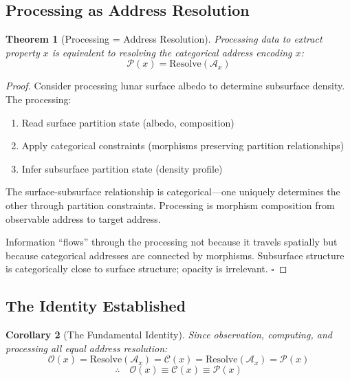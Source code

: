 \documentclass[twocolumn,10pt]{article}
\newtheorem{theorem}{Theorem}[section]
\newtheorem{corollary}[theorem]{Corollary}
\theoremstyle{definition}
\theoremstyle{remark}
\newcommand{\Obs}{\mathcal{O}}
\newcommand{\Comp}{\mathcal{C}}
\newcommand{\Proc}{\mathcal{P}}
\begin{document}
\subsection{Processing as Address Resolution}

\begin{theorem}[Processing = Address Resolution]
\label{thm:proc}
Processing data to extract property $x$ is equivalent to resolving the categorical address encoding $x$:
\begin{equation}
\Proc(x) = \text{Resolve}(\mathcal{A}_x)
\end{equation}
\end{theorem}

\begin{proof}
Consider processing lunar surface albedo to determine subsurface density. The processing:
\begin{enumerate}
    \item Read surface partition state (albedo, composition)
    \item Apply categorical constraints (morphisms preserving partition relationships)
    \item Infer subsurface partition state (density profile)
\end{enumerate}

The surface-subsurface relationship is categorical---one uniquely determines the other through partition constraints. Processing is morphism composition from observable address to target address.

Information ``flows'' through the processing not because it travels spatially but because categorical addresses are connected by morphisms. Subsurface structure is categorically close to surface structure; opacity is irrelevant. $\square$
\end{proof}

\subsection{The Identity Established}

\begin{corollary}[The Fundamental Identity]
Since observation, computing, and processing all equal address resolution:
\begin{equation}
\Obs(x) = \text{Resolve}(\mathcal{A}_x) = \Comp(x) = \text{Resolve}(\mathcal{A}_x) = \Proc(x)
\end{equation}
\begin{equation}
\therefore \quad \boxed{\Obs(x) \equiv \Comp(x) \equiv \Proc(x)}
\end{equation}
\end{corollary}
\end{document}
